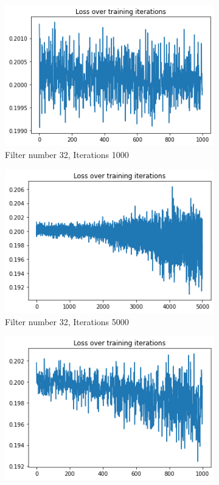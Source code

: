 \documentclass [a4paper, 11pt] {article}
\begin{document}
\begin{enumerate}
\begin{figure}[!h]
	\centering
	\begin{subfigure}{0.4\textwidth}
		\centering
		\includegraphics[width=\textwidth]{img/32-1000.png}
		\caption{Filter number 32, Iterations 1000}
		\label{fig:32-1000}
	\end{subfigure}
	\begin{subfigure}{0.4\textwidth}
		\centering
		\includegraphics[width=\textwidth]{img/32-5000.png}
		\caption{Filter number 32, Iterations 5000}
		\label{fig:32-5000}
	\end{subfigure}
	\begin{subfigure}{0.4\textwidth}
		\centering
		\includegraphics[width=\textwidth]{img/128-1000.png}

\end{subfigure}
\end{figure}
\end{enumerate}
\end{document}
